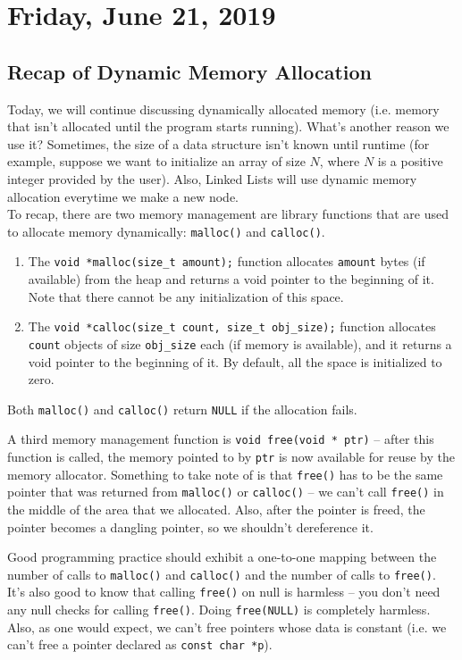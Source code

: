 \section{Friday, June 21, 2019} 
\subsection{Recap of Dynamic Memory Allocation}
Today, we will continue discussing dynamically allocated memory (i.e. memory that isn't allocated until the program starts running). What's another reason we use it? Sometimes, the size of a data structure isn't known until runtime (for example, suppose we want to initialize an array of size $N$, where $N$ is a positive integer provided by the user). Also, Linked Lists will use dynamic memory allocation everytime we make a new node. \\

To recap, there are two memory management are library functions that are used to allocate memory dynamically: \texttt{malloc()} and \texttt{calloc()}. \begin{enumerate}
    \item The \verb!void *malloc(size_t amount);! function allocates \verb!amount! bytes (if available) from the heap and returns a void pointer to the beginning of it. Note that there cannot be any initialization of this space. 
    \item The \verb!void *calloc(size_t count, size_t obj_size);! function allocates \verb!count! objects of size \verb!obj_size! each (if memory is available), and it returns a void pointer to the beginning of it. By default, all the space is initialized to zero.
\end{enumerate}

Both \verb!malloc()! and \verb!calloc()! return \verb!NULL! if the allocation fails. 

A third memory management function is \verb!void free(void * ptr)! -- after this function is called, the memory pointed to by \verb!ptr! is now available for reuse by the memory allocator. Something to take note of is that \verb!free()! has to be the same pointer that was returned from \verb!malloc()! or \verb!calloc()! -- we can't call \verb!free()! in the middle of the area that we allocated. Also, after the pointer is freed, the pointer becomes a dangling pointer, so we shouldn't dereference it. 

Good programming practice should exhibit a one-to-one mapping between the number of calls to \verb!malloc()! and \verb!calloc()! and the number of calls to \verb!free()!. It's also good to know that calling \verb!free()! on null is harmless -- you don't need any null checks for calling \verb!free()!. Doing \verb!free(NULL)! is completely harmless. Also, as one would expect, we can't free pointers whose data is constant (i.e. we can't free a pointer declared as \verb!const char *p!). 


